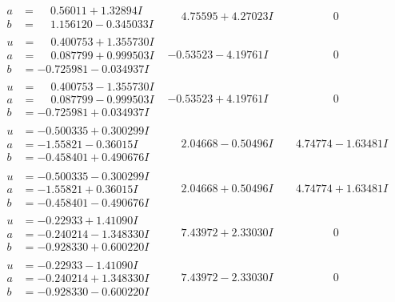 \documentclass[1p]{elsarticle_modified}
\theoremstyle{definition}
\begin{document}
$$\begin{array}{c|c|c}
\begin{aligned}
a &= \phantom{-}0.56011 + 1.32894 I \\
b &= \phantom{-}1.156120 - 0.345033 I\end{aligned}
 & \phantom{-}4.75595 + 4.27023 I & \phantom{-0.000000 } 0 \\ \hline\begin{aligned}
u &= \phantom{-}0.400753 + 1.355730 I \\
a &= \phantom{-}0.087799 + 0.999503 I \\
b &= -0.725981 - 0.034937 I\end{aligned}
 & -0.53523 - 4.19761 I & \phantom{-0.000000 } 0 \\ \hline\begin{aligned}
u &= \phantom{-}0.400753 - 1.355730 I \\
a &= \phantom{-}0.087799 - 0.999503 I \\
b &= -0.725981 + 0.034937 I\end{aligned}
 & -0.53523 + 4.19761 I & \phantom{-0.000000 } 0 \\ \hline\begin{aligned}
u &= -0.500335 + 0.300299 I \\
a &= -1.55821 - 0.36015 I \\
b &= -0.458401 + 0.490676 I\end{aligned}
 & \phantom{-}2.04668 - 0.50496 I & \phantom{-}4.74774 - 1.63481 I \\ \hline\begin{aligned}
u &= -0.500335 - 0.300299 I \\
a &= -1.55821 + 0.36015 I \\
b &= -0.458401 - 0.490676 I\end{aligned}
 & \phantom{-}2.04668 + 0.50496 I & \phantom{-}4.74774 + 1.63481 I \\ \hline\begin{aligned}
u &= -0.22933 + 1.41090 I \\
a &= -0.240214 - 1.348330 I \\
b &= -0.928330 + 0.600220 I\end{aligned}
 & \phantom{-}7.43972 + 2.33030 I & \phantom{-0.000000 } 0 \\ \hline\begin{aligned}
u &= -0.22933 - 1.41090 I \\
a &= -0.240214 + 1.348330 I \\
b &= -0.928330 - 0.600220 I\end{aligned}
 & \phantom{-}7.43972 - 2.33030 I & \phantom{-0.000000 } 0 \\ \hline\begin{aligned}

\end{aligned}
\end{array}$$
\end{document}

